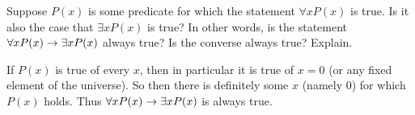 \begin{questions}

  \begin{answer}
  \end{answer}



\question Suppose $P(x)$ is some predicate for which the statement $\forall x P(x)$ is true.  Is it also the case that $\exists x P(x)$ is true?  In other words, is the statement $\forall x P(x) \rightarrow \exists x P(x)$ always true?  Is the converse always true?  Explain.

	\begin{answer}
	  If $P(x)$ is true of every $x$, then in particular it is true of $x = 0$ (or any fixed element of the universe).  So then there is definitely some $x$ (namely 0) for which $P(x)$ holds.  Thus $\forall x P(x) \rightarrow \exists x P(x)$ is always true.
	  

\end{answer}
\end{questions}
